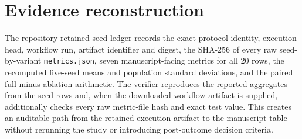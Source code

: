 \section{Evidence reconstruction}
\label{sec:evidence-reconstruction-v2}

The repository-retained seed ledger records the exact protocol identity, execution head, workflow run, artifact identifier and digest, the SHA-256 of every raw seed-by-variant \texttt{metrics.json}, seven manuscript-facing metrics for all 20 rows, the recomputed five-seed means and population standard deviations, and the paired full-minus-ablation arithmetic. The verifier reproduces the reported aggregates from the seed rows and, when the downloaded workflow artifact is supplied, additionally checks every raw metric-file hash and exact test value. This creates an auditable path from the retained execution artifact to the manuscript table without rerunning the study or introducing post-outcome decision criteria.
